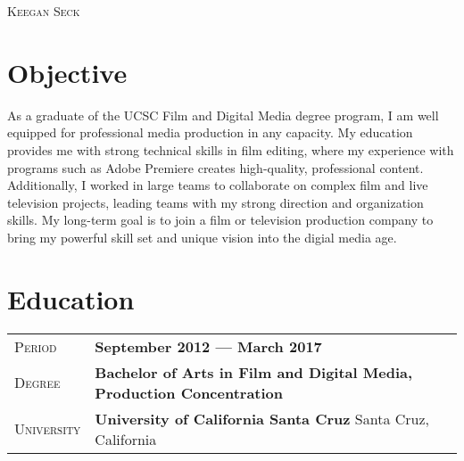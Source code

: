 \documentclass[a4paper, oneside, final]{scrartcl} %
\newcommand{\gray}{\rowcolor[gray]{.90}} %
\begin{document}
\begin{center} %


{\fontsize{20}{16}\selectfont\scshape Keegan Seck}\\ %


\section{Objective}
As a graduate of the UCSC Film and Digital Media degree program, I am well equipped for professional media production in any capacity. My education provides me with strong technical skills in film editing, where my experience with programs such as Adobe Premiere creates high-quality, professional content. Additionally, I worked in large teams to collaborate on complex film and live television projects, leading teams with my strong direction and organization skills. My long-term goal is to join a film or television production company to bring my powerful skill set and unique vision into the digial media age.


\section{Education}


\begin{tabularx}{0.97\linewidth}{>{\raggedleft\scshape}p{2cm}X}
\gray Period & \textbf{September 2012 --- March 2017}\\
\gray Degree & \textbf{Bachelor of Arts in Film and Digital Media, Production Concentration}\\
\gray University & \textbf{University of California Santa Cruz} \hfill Santa Cruz, California\\
\end{tabularx}


\end{center}
\end{document}
